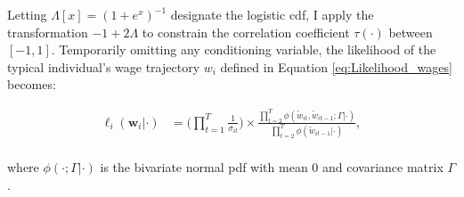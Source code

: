 \documentclass[12pt, a4paper]{article}
\begin{document}
Letting $\Lambda[x]=(1+e^x)^{-1}$ designate the logistic cdf, I apply the transformation $-1+2\Lambda$ to constrain the correlation coefficient $\tau(\cdot)$ between $[-1,1]$. Temporarily omitting any conditioning variable, the likelihood of the typical individual's wage trajectory $w_i$ defined in Equation \eqref{eq:Likelihood_wages} becomes:

\begin{align}\label{eq:Likelihood_wages_pair}
\ell_{i}(\textbf{w}_i|\cdot) & = \Big(\prod_{t=1}^{T}\frac{1}{\sigma_{it}} \Big)\times\frac{\prod\limits_{t=2}^{T} \phi(\tilde{w}_{it},\tilde{w}_{it-1};\Gamma|\cdot)}{\prod\limits_{t=2}^{T} \phi(\tilde{w}_{it-1}|\cdot)} , \\ \nonumber
\end{align}

where $\phi(\cdot;\Gamma|\cdot)$ is the bivariate normal pdf with mean 0 and covariance matrix $\Gamma$.

%
%









\end{document}
